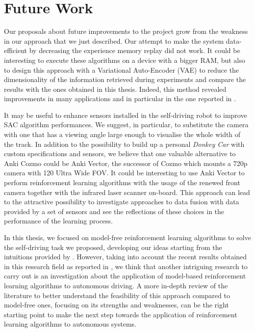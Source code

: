\section{Future Work}

Our proposals about future improvements to the project grow from the weakness in our approach that we just described.
Our attempt to make the system data-efficient by decreasing the experience memory replay did not work.
It could be interesting to execute these algorithms on a device with a bigger RAM, but also to design this approach with a Variational Auto-Encoder (VAE) \cite{kingma2013auto} to reduce the dimensionality of the information retrieved during experiments and compare the results with the ones obtained in this thesis.
Indeed, this method revealed improvements in many applications and in particular in the one reported in \cite{kendall2018learning,kendall2019learning}.

It may be useful to enhance sensors installed in the self-driving robot to improve SAC algorithm performances.
We suggest, in particular, to substitute the camera with one that has a viewing angle large enough to visualise the whole width of the track.
In addition to the possibility to build up a personal \textit{Donkey Car} with custom specifications and sensors, we believe that one valuable alternative to Anki Cozmo could be Anki Vector, the successor of Cozmo which mounts a 720p camera with 120 Ultra Wide FOV.
It could be interesting to use Anki Vector to perform reinforcement learning algorithms with the usage of the renewed front camera together with the infrared laser scanner on-board. This approach can lead to the attractive possibility to investigate approaches to data fusion with data provided by a set of sensors and see the reflections of these choices in the performance of the learning process.

In this thesis, we focused on model-free reinforcement learning algorithms to solve the self-driving task we proposed, developing our ideas starting from the intuitions provided by \cite{kendall2018learning,kendall2019learning}.
However, taking into account the recent results obtained in this research field as reported in \cite{hawke2019urban,wayve2019learned}, we think that another intriguing research to carry out is an investigation about the application of model-based reinforcement learning algorithms to autonomous driving.
A more in-depth review of the literature to better understand the feasibility of this approach compared to model-free ones, focusing on its strengths and weaknesses, can be the right starting point to make the next step towards the application of reinforcement learning algorithms to autonomous systems.
